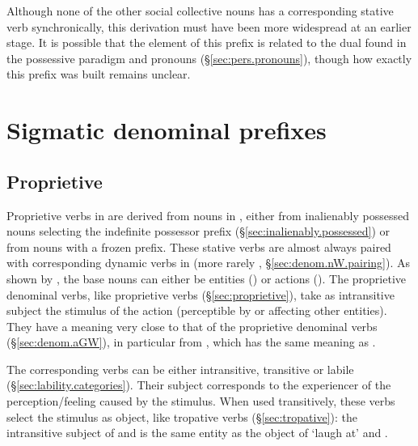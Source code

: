 Although none of the other social collective nouns has a corresponding  stative verb synchronically, this derivation must have been more widespread at an earlier stage. It is possible that the  element of this prefix is related to the dual  found in the possessive paradigm and pronouns (§\ref{sec:pers.pronouns}), though how exactly this prefix was built remains unclear.
 
\section{Sigmatic denominal prefixes} \label{sec:sigmatic.denominal}
\subsection{Proprietive  } \label{sec:denom.sA.proprietive}
Proprietive verbs in  are derived from nouns in , either from inalienably possessed nouns selecting the indefinite possessor prefix  (§\ref{sec:inalienably.possessed}) or from nouns with a frozen  prefix. These stative verbs are almost always paired with corresponding dynamic verbs in  (more rarely  , §\ref{sec:denom.nW.pairing}). As shown by , the base nouns can either be entities () or actions (). The proprietive denominal verbs, like  proprietive verbs (§\ref{sec:proprietive}), take as intransitive subject the stimulus of the action (perceptible by or affecting other entities). They have a meaning very close to that of the  proprietive denominal verbs (§\ref{sec:denom.aGW}), in particular 	from , which has the same meaning as  .  

The corresponding  verbs can be either intransitive, transitive or labile (§\ref{sec:lability.categories}). Their subject corresponds to the experiencer of the perception/feeling caused by the stimulus. When used transitively, these verbs select the stimulus as object, like tropative verbs (§\ref{sec:tropative}): the intransitive subject of   and  is the same entity as the object of  `laugh at' and .  
 
